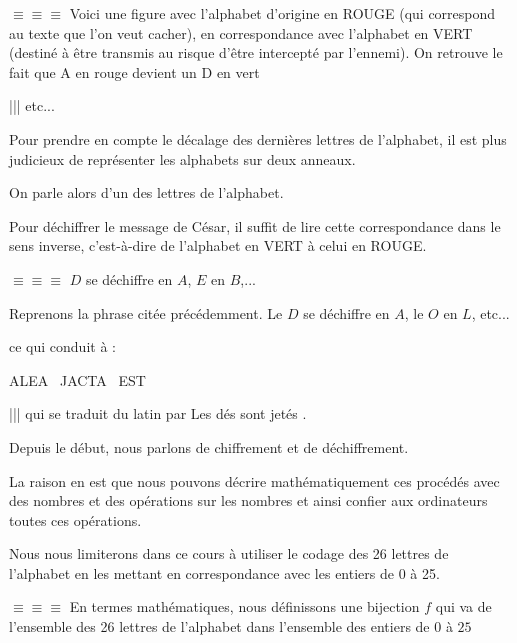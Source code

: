 \change


$\equiv \equiv \equiv$ Voici une figure avec l'alphabet d'origine en ROUGE (qui correspond au texte que l'on veut cacher), en correspondance avec l'alphabet 
en VERT (destiné à être transmis au risque d'être intercepté par l'ennemi). On retrouve le fait que A en rouge devient un D en vert 

||| etc...


\diapo

Pour prendre en compte le décalage des dernières lettres de l'alphabet, il est plus judicieux de représenter les alphabets sur deux anneaux.

\change

On parle alors d'un  des lettres de l'alphabet.

\change


Pour déchiffrer le message de César, il suffit de lire cette correspondance dans le sens inverse, c'est-à-dire de l'alphabet en VERT à celui en ROUGE.

\change

$\equiv \equiv \equiv$ $D$ se déchiffre en $A$, $E$ en $B$,...

\change

Reprenons la phrase citée précédemment. Le $D$ se déchiffre en $A$, le $O$ en $L$, etc... 

\change
ce qui conduit à :

\centerline{ALEA \  JACTA \  EST}


||| qui se traduit du latin par \og Les dés sont jetés \fg.



\diapo

Depuis le début, nous parlons de chiffrement et de déchiffrement. 

La raison en est que nous pouvons décrire mathématiquement ces procédés avec des nombres et des opérations sur les nombres et ainsi confier aux ordinateurs toutes ces opérations.

Nous nous limiterons dans ce cours à utiliser le codage des 26 lettres de l'alphabet en les mettant en correspondance avec les entiers de 0 à 25.

\change

$\equiv \equiv \equiv$ En termes mathématiques, nous définissons une bijection $f$ 
qui va de l'ensemble des 26 lettres de l'alphabet dans l'ensemble des entiers de $0$ à $25$

